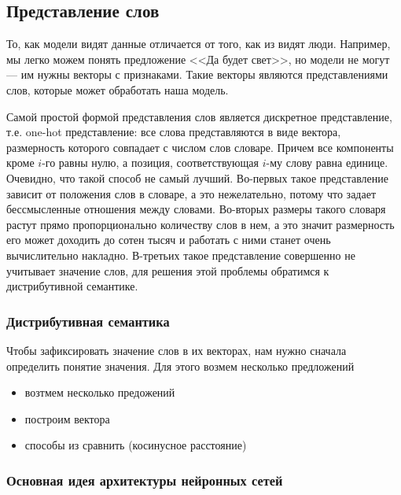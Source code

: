 \subsection{Представление слов}
\label{section:textRepsesentation}

То, как модели видят данные отличается от того, как из видят люди. Например, мы легко можем понять
предложение <<Да будет свет>>, но модели не могут --- им нужны векторы с признаками. Такие векторы являются
представлениями слов, которые может обработать наша модель.

\bigskip
Самой простой формой представления слов является дискретное представление, т.е. one-hot представление: все
слова представляются в виде вектора, размерность которого совпадает с числом слов словаре. Причем все
компоненты кроме $i$-го равны нулю, а позиция, соответствующая $i$-му слову равна единице. Очевидно, что такой
способ не самый лучший. Во-первых такое представление зависит от положения слов в словаре, а это нежелательно,
потому что задает бессмысленные отношения между словами. Во-вторых размеры такого словаря растут прямо
пропорционально количеству слов в нем, а это значит размерность его может доходить до сотен тысяч и работать с
ними станет очень вычислительно накладно. В-третьих такое представление совершенно не учитывает значение слов,
для решения этой проблемы обратимся к дистрибутивной семантике.

\subsubsection{Дистрибутивная семантика}

Чтобы зафиксировать значение слов в их векторах, нам нужно сначала определить понятие значения. Для этого
возмем несколько предложений

\bigskip
\begin{itemize}
 \item возтмем несколько предожений
 \item построим вектора
 \item способы из сравнить (косинусное расстояние)
\end{itemize}


















\subsubsection{Основная идея архитектуры нейронных сетей}

